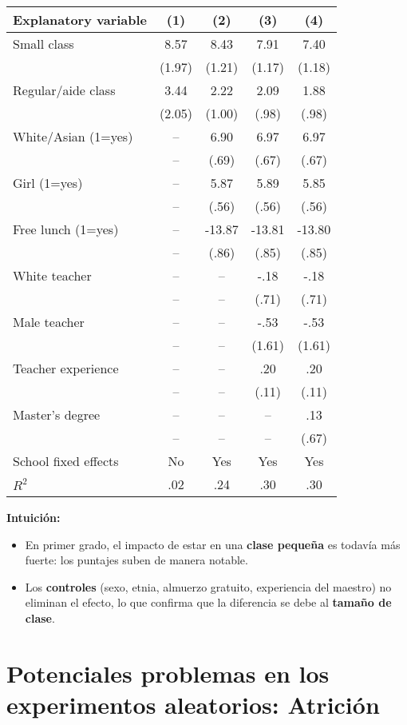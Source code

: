 \documentclass[12pt]{article}
\begin{document}
\begin{table}[H]
\centering
\begin{tabular}{lcccc}
\textbf{Explanatory variable} & (1) & (2) & (3) & (4) \\
\hline
Small class & 8.57 & 8.43 & 7.91 & 7.40 \\
 & (1.97) & (1.21) & (1.17) & (1.18) \\
Regular/aide class & 3.44 & 2.22 & 2.09 & 1.88 \\
 & (2.05) & (1.00) & (.98) & (.98) \\
White/Asian (1=yes) & -- & 6.90 & 6.97 & 6.97 \\
 & -- & (.69) & (.67) & (.67) \\
Girl (1=yes) & -- & 5.87 & 5.89 & 5.85 \\
 & -- & (.56) & (.56) & (.56) \\
Free lunch (1=yes) & -- & -13.87 & -13.81 & -13.80 \\
 & -- & (.86) & (.85) & (.85) \\
White teacher & -- & -- & -.18 & -.18 \\
 & -- & -- & (.71) & (.71) \\
Male teacher & -- & -- & -.53 & -.53 \\
 & -- & -- & (1.61) & (1.61) \\
Teacher experience & -- & -- & .20 & .20 \\
 & -- & -- & (.11) & (.11) \\
Master's degree & -- & -- & -- & .13 \\
 & -- & -- & -- & (.67) \\
\hline
School fixed effects & No & Yes & Yes & Yes \\
$R^2$ & .02 & .24 & .30 & .30 \\
\end{tabular}
\end{table}

\textbf{Intuición:}
\begin{itemize}
    \item En primer grado, el impacto de estar en una \textbf{clase pequeña} es todavía más fuerte: los puntajes suben de manera notable.
    \item Los \textbf{controles} (sexo, etnia, almuerzo gratuito, experiencia del maestro) no eliminan el efecto, lo que confirma que la diferencia se debe al \textbf{tamaño de clase}.
\end{itemize}

\section*{\noindent\textbf{Potenciales problemas en los experimentos aleatorios: Atrición}}
\end{document}
